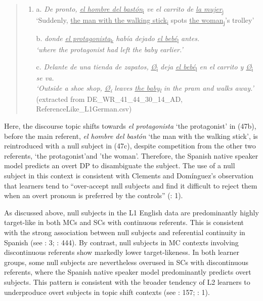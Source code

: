 \documentclass[
  letterpaper,
  DIV=11,
  numbers=noendperiod]{scrartcl}
\begin{document}
\begin{quote}
\begin{enumerate}
\def\labelenumi{\arabic{enumi}.}
\setcounter{enumi}{46}
\item
  a. \emph{De pronto, \ul{el hombre del bastón}}\textsubscript{i}
  \emph{ve el carrito de \ul{la mujer}}\textsubscript{j}\\
  `Suddenly, \ul{the man with the walking stick}\textsubscript{i} spots
  \ul{the woman}\textsubscript{j}'s trolley'

  b. \emph{donde \ul{el protagonista}}\textsubscript{k} \emph{había
  dejado \ul{el bebé}}\textsubscript{l} \emph{antes.\\
  `\emph{where the protagonist had left the baby earlier.}'}

  c. \emph{Delante de una tienda de zapatos,}
  \ul{\emph{Ø}}\textsubscript{i} \emph{deja \ul{el
  bebé}}\textsubscript{l} \emph{en el carrito y \ul{Ø}}\textsubscript{i}
  \emph{se va.\\
  `\emph{Outside a shoe shop, \ul{Ø}\textsubscript{i} leaves \ul{the
  baby}\textsubscript{l} in the pram and walks away.}'}\\
  (extracted from DE\_WR\_41\_44\_30\_14\_AD,
  ReferenceLike\_L1German.csv)
\end{enumerate}
\end{quote}

Here, the discourse topic shifts towards \emph{el protagonista} `the
protagonist' in (47b), before the main referent, \emph{el hombre del
bastón} `the man with the walking stick', is reintroduced with a null
subject in (47c), despite competition from the other two referents, `the
protagonist'and 'the woman'. Therefore, the Spanish native speaker model
predicts an overt DP to disambiguate the subject. The use of a null
subject in this context is consistent with Clements and Domínguez's
observation that learners tend to ``over-accept null subjects and find
it difficult to reject them when an overt pronoun is preferred by the
controls'' (: 1).

As discussed above, null subjects in the L1 English data are
predominantly highly target-like in both MCs and SCs with continuous
referents. This is consistent with the strong association between null
subjects and referential continuity in Spanish (see
: 3;
: 444). By contrast, null subjects in MC contexts involving
discontinuous referents show markedly lower target-likeness. In both
learner groups, some null subjects are nevertheless overused in SCs with
discontinuous referents, where the Spanish native speaker model
predominantly predicts overt subjects. This pattern is consistent with
the broader tendency of L2 learners to underproduce overt subjects in
topic shift contexts (see : 157;
:
1).
\end{document}
